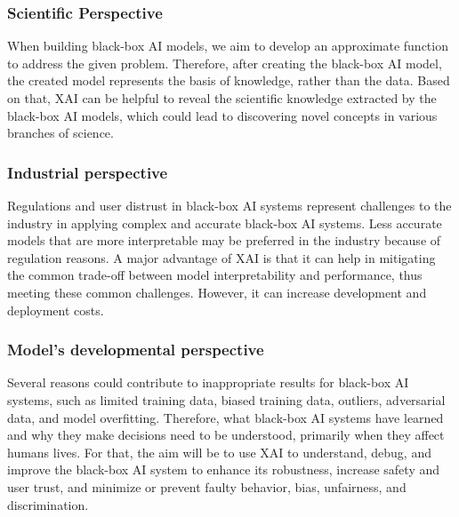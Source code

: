 \subsubsection*{Scientific Perspective}
When building black-box AI models, we aim to develop an approximate function to address the given problem. 
Therefore, after creating the black-box AI model, the created model represents the basis of knowledge, rather than the data. 
Based on that, XAI can be helpful to reveal the scientific knowledge extracted by the black-box AI models, which could lead to discovering novel
concepts in various branches of science.

\subsubsection*{Industrial perspective}
Regulations and user distrust in black-box AI systems represent challenges to the industry in applying complex and accurate 
black-box AI systems. Less accurate models that are more interpretable may be preferred in the industry because of regulation
reasons. A major advantage of XAI is that it can help in mitigating the common trade-off between model interpretability and performance,
thus meeting these common challenges. 
However, it can increase development and deployment costs.

\subsubsection*{Model's developmental perspective}
Several reasons could contribute to inappropriate results for black-box AI systems, such as limited training data, biased training data, outliers, adversarial data, and model overfitting. 
Therefore, what black-box AI systems have learned and why they make decisions need to be understood, primarily when they affect humans lives. 
For that, the aim will be to use XAI to understand, debug, and improve the black-box AI system to enhance its robustness, increase safety and user trust, and minimize or prevent faulty behavior, bias, unfairness, and discrimination.

